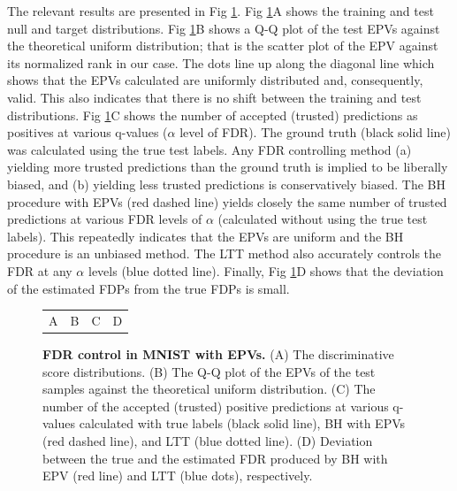\documentclass[10pt,letterpaper]{article}
\begin{document}
The relevant results are presented in Fig \ref{fig:binary}.
Fig \ref{fig:binary}A shows the training and test null and target distributions. %
Fig \ref{fig:binary}B shows a Q-Q plot of the test EPVs against the theoretical uniform distribution; that is the scatter plot of the EPV against its normalized rank in our case.
The dots line up along the diagonal line which shows that the EPVs calculated are uniformly distributed and, consequently, valid.
This also indicates that there is no shift between the training and test distributions. %
Fig \ref{fig:binary}C shows the number of accepted (trusted) predictions as positives at various q-values ($\alpha$ level of FDR).
The ground truth (black solid line) was calculated using the true test labels.
Any FDR controlling method (a) yielding more trusted predictions than the ground truth is implied to be liberally biased, and (b) yielding less trusted predictions is conservatively biased.
The BH procedure with EPVs (red dashed line) yields closely the same number of trusted predictions at various FDR levels of $\alpha$ (calculated without using the true test labels).
This repeatedly indicates that the EPVs are uniform and the  BH procedure is an unbiased method.
The LTT method also accurately controls the FDR at any $\alpha$ levels (blue dotted line).
Finally, Fig \ref{fig:binary}D shows that the deviation of the estimated FDPs from the true FDPs is small.

\begin{figure}
	\centering
	\begin{tabular}{cccc}
		A & B & C & D \\
	\end{tabular}
	\caption{{\bf FDR control in MNIST with EPVs. } (A) The discriminative score distributions.
	(B) The Q-Q plot of the EPVs of the test samples against the theoretical uniform distribution.
	(C) The number of the accepted (trusted) positive predictions at various q-values calculated with true labels (black solid line), BH with EPVs (red dashed line), and LTT (blue dotted line).
	(D) Deviation between the true and the estimated FDR produced by BH with EPV (red line) and LTT (blue dots), respectively.}
	\label{fig:binary}
\end{figure}
 
\end{document}
